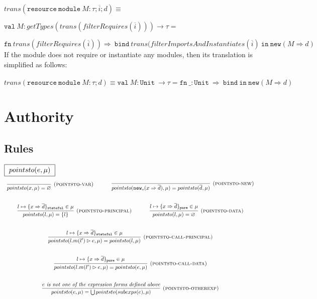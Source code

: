 \documentclass{llncs}
\newcommand{\keywadj}[1]{\mathtt{#1}}
\newcommand{\keyw}[1]{\keywadj{#1}~}
\begin{document}
\noindent$trans(\keyw{resource} \keyw{module} M : \tau; \overline{i}; d) \equiv$

$\keyw{val} M : getTypes(trans(filterRequires(\overline{i}))) \rightarrow \tau = $

$\keyw{fn} trans(filterRequires(\overline{i})) \Rightarrow~\keyw{bind} trans(filterImportsAndInstantiates(\overline{i})~\keyw{in} \keywadj{new}(M \Rightarrow d)$\\

\noindent If the module does not require or instantiate any modules, then its translation is simplified as follows:
\\\\
\noindent$trans(\keyw{resource} \keyw{module} M : \tau; d) \equiv \keyw{val} M : \keyw{Unit} \rightarrow \tau = \keyw{fn} \_ : \keyw{Unit} \Rightarrow~\keyw{bind} \keyw{in} \keywadj{new}(M \Rightarrow d)$


\newpage

\section{Authority}

\subsection{Rules}

$\fbox{$~pointsto(e, \mu)~$}$
\[
\begin{array}{c}
\infer[\textsc{(pointsto-var)}]
  {pointsto(x,\mu) = \varnothing }
  {}%
~~~~~~~~~~
\infer[\textsc{(pointsto-new)}]
  {pointsto(\keywadj{new}_{s}(x \Rightarrow \overline{d}),\mu) = pointsto(\overline{d},\mu) }
  {}\\[5ex]

\infer[\textsc{(pointsto-principal)}]
  {pointsto(l,\mu) = \{ l \}}
  {l \mapsto \{ x \Rightarrow \overline{d} \}_\keywadj{stateful} \in \mu}%
~~~~~~~~~~
\infer[\textsc{(pointsto-data)}]
  {pointsto(l,\mu) = \varnothing }
  {l \mapsto \{ x \Rightarrow \overline{d} \}_\keywadj{pure} \in \mu}\\[5ex]

\infer[\textsc{(pointsto-call-principal)}]
  {pointsto(l.m(l') \rhd e,\mu) = pointsto(l, \mu) }
  {l \mapsto \{ x \Rightarrow \overline{d} \}_\keywadj{stateful} \in \mu}\\[5ex]

\infer[\textsc{(pointsto-call-data)}]
  {pointsto(l.m(l') \rhd e,\mu) = pointsto(e,\mu)}
  {l \mapsto \{ x \Rightarrow \overline{d} \}_\keywadj{pure} \in \mu}\\[5ex]

\infer[\textsc{(pointsto-otherexp)}]
  {pointsto(e,\mu) = \bigcup pointsto(subexps(e),\mu) }
  {\textit{$e$ is not one of the expression forms defined above}}\\[5ex]

\end{array}
\]
\end{document}
